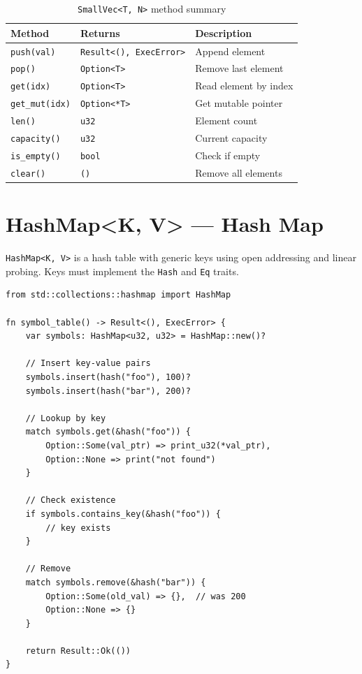 \begin{table}[h]
\centering
\begin{tabular}{lll}
\textbf{Method} & \textbf{Returns} & \textbf{Description} \\
\hline
\texttt{push(val)} & \texttt{Result<(), ExecError>} & Append element \\
\texttt{pop()} & \texttt{Option<T>} & Remove last element \\
\texttt{get(idx)} & \texttt{Option<T>} & Read element by index \\
\texttt{get\_mut(idx)} & \texttt{Option<*T>} & Get mutable pointer \\
\texttt{len()} & \texttt{u32} & Element count \\
\texttt{capacity()} & \texttt{u32} & Current capacity \\
\texttt{is\_empty()} & \texttt{bool} & Check if empty \\
\texttt{clear()} & \texttt{()} & Remove all elements \\
\end{tabular}
\caption{\texttt{SmallVec<T, N>} method summary}
\end{table}

\section{HashMap<K, V> --- Hash Map}
\label{sec:hashmap}

\texttt{HashMap<K, V>} is a hash table with generic keys using open addressing and linear probing. Keys must implement the \texttt{Hash} and \texttt{Eq} traits.

\begin{lstlisting}
from std::collections::hashmap import HashMap

fn symbol_table() -> Result<(), ExecError> {
    var symbols: HashMap<u32, u32> = HashMap::new()?

    // Insert key-value pairs
    symbols.insert(hash("foo"), 100)?
    symbols.insert(hash("bar"), 200)?

    // Lookup by key
    match symbols.get(&hash("foo")) {
        Option::Some(val_ptr) => print_u32(*val_ptr),
        Option::None => print("not found")
    }

    // Check existence
    if symbols.contains_key(&hash("foo")) {
        // key exists
    }

    // Remove
    match symbols.remove(&hash("bar")) {
        Option::Some(old_val) => {},  // was 200
        Option::None => {}
    }

    return Result::Ok(())
}
\end{lstlisting}

